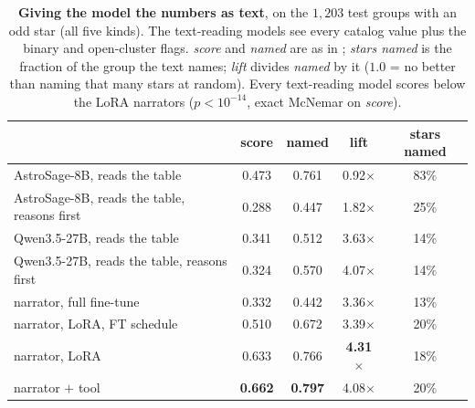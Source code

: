 \begin{table}[h]\centering\small
\caption{\textbf{Giving the model the numbers as text}, on the $1{,}203$ test
groups with an odd star (all five kinds). The text-reading models see
every catalog value plus the binary and open-cluster flags.
\emph{score} and \emph{named} are as in ;
\emph{stars named} is the fraction of the group the text names; \emph{lift}
divides \emph{named} by it ($1.0$ = no better than naming that many stars at
random). Every text-reading model scores below the LoRA narrators
($p<10^{-14}$, exact McNemar on \emph{score}).}
\label{tab:text}
\begin{tabular}{lcccc}
\toprule
 & score & named & lift & stars named \\
\midrule
AstroSage-8B, reads the table                & 0.473 & 0.761 & 0.92$\times$ & 83\% \\
AstroSage-8B, reads the table, reasons first & 0.288 & 0.447 & 1.82$\times$ & 25\% \\
Qwen3.5-27B, reads the table                 & 0.341 & 0.512 & 3.63$\times$ & 14\% \\
Qwen3.5-27B, reads the table, reasons first  & 0.324 & 0.570 & 4.07$\times$ & 14\% \\
\midrule
narrator, full fine-tune                & 0.332 & 0.442 & 3.36$\times$ & 13\% \\
narrator, LoRA, FT schedule             & 0.510 & 0.672 & 3.39$\times$ & 20\% \\
narrator, LoRA                          & 0.633 & 0.766 & \textbf{4.31}$\times$ & 18\% \\
narrator $+$ tool                            & \textbf{0.662} & \textbf{0.797} & 4.08$\times$ & 20\% \\
\bottomrule
\end{tabular}
\end{table}


\clearpage
